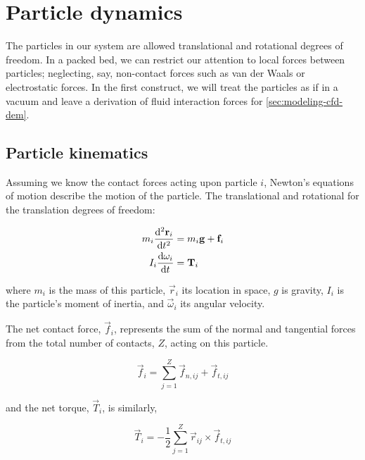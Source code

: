 \section{Particle dynamics}\label{sec:particle-dynamics}

The particles in our system are allowed translational and rotational degrees of freedom. In a packed bed, we can restrict our attention to local forces between particles; neglecting, say, non-contact forces such as van der Waals or electrostatic forces. In the first construct, we will treat the particles as if in a vacuum and leave a derivation of fluid interaction forces for \cref{sec:modeling-cfd-dem}.



\subsection{Particle kinematics}

Assuming we know the contact forces acting upon particle $i$, Newton's equations of motion describe the motion of the particle. The translational and rotational for the translation degrees of freedom:

\begin{subequations}
\label{eq:newtons-second}
\begin{align}
	m_i  \frac{\mathrm{d}^2{\mathbf{r}_i}}{\mathrm{d}t^2}   & = m_i\mathbf{g} + \mathbf{f}_i \label{eq:newton-translational} \\
	I_i\frac{\mathrm{d}{\mathbf{\omega}_i}}{\mathrm{d}t} & = \mathbf{T}_i \label{eq:newton-rotational}
\end{align}
\end{subequations}

where $m_i$ is the mass of this particle, $\vec{r}_i$ its location in space, $g$ is gravity, $I_i$ is the particle's moment of inertia, and $\vec{\omega}_i$ its angular velocity.

The net contact force, $\vec{f}_i$, represents the sum of the normal and tangential forces from the total number of contacts, $Z$, acting on this particle.

\begin{equation}
 	\vec{f}_i = \sum_{j=1}^{Z} \vec{f}_{n,ij} + \vec{f}_{t,ij}
 \end{equation} 

and the net torque, $\vec{T}_i$, is similarly,

\begin{equation}
	\vec{T}_i = -\frac{1}{2}\sum_{j=1}^{Z} \vec{r}_{ij} \times \vec{f}_{t,ij}
\end{equation}



